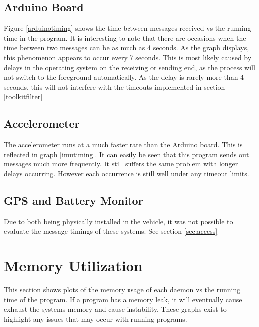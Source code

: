 \subsection{Arduino Board}

Figure \ref{arduinotiming} shows the time between messages received vs the running time in the program. It is interesting to note that there are occasions when the time between two messages can be as much as 4 seconds. As the graph displays, this phenomenon appears to occur every 7 seconds. This is most likely caused by delays in the operating system on the receiving or sending end, as the process will not switch to the foreground automatically. As the delay is rarely more than 4 seconds, this will not interfere with the timeouts implemented in section \ref{toolkitfilter}


\subsection{Accelerometer}

The accelerometer runs at a much faster rate than the Arduino board. This is reflected in graph \ref{imutiming}. It can easily be seen that this program sends out messages much more frequently.  It still suffers the same problem with longer delays occurring. However each occurrence is still well under any timeout limits. 


\subsection{GPS and Battery Monitor}

Due to both being physically installed in the vehicle, it was not possible to evaluate the message timings of these systems. See section \ref{sec:access}


\section{Memory Utilization}
\label{sec:memutilization}

This section shows plots of the memory usage of each daemon vs the running time of the program. If a program has a memory leak, it will eventually cause exhaust the systems memory and cause instability. These graphs exist to highlight any issues that may occur with running programs.


